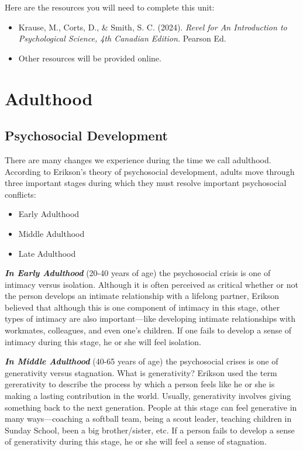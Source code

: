 \documentclass[
]{book}
\providecommand{\tightlist}{%
  \setlength{\itemsep}{0pt}\setlength{\parskip}{0pt}}
\begin{document}
Here are the resources you will need to complete this unit:

\begin{itemize}
\tightlist
\item
  Krause, M., Corts, D., \& Smith, S. C. (2024). \emph{Revel for An Introduction to Psychological Science, 4th Canadian Edition.} Pearson Ed.
\item
  Other resources will be provided online.
\end{itemize}

\hypertarget{adulthood}{%
\section{Adulthood}\label{adulthood}}

\hypertarget{psychosocial-development}{%
\subsection*{Psychosocial Development}\label{psychosocial-development}}

There are many changes we experience during the time we call adulthood. According to Erikson's theory of psychosocial development, adults move through three important stages during which they must resolve important psychosocial conflicts:

\begin{itemize}
\tightlist
\item
  Early Adulthood\\
\item
  Middle Adulthood\\
\item
  Late Adulthood
\end{itemize}

\textbf{\emph{In Early Adulthood}} (20-40 years of age) the psychosocial crisis is one of intimacy versus isolation. Although it is often perceived as critical whether or not the person develops an intimate relationship with a lifelong partner, Erikson believed that although this is one component of intimacy in this stage, other types of intimacy are also important---like developing intimate relationships with workmates, colleagues, and even one's children. If one fails to develop a sense of intimacy during this stage, he or she will feel isolation.

\textbf{\emph{In Middle Adulthood}} (40-65 years of age) the psychosocial crises is one of generativity versus stagnation. What is generativity? Erikson used the term gererativity to describe the process by which a person feels like he or she is making a lasting contribution in the world. Usually, generativity involves giving something back to the next generation. People at this stage can feel generative in many ways---coaching a softball team, being a scout leader, teaching children in Sunday School, been a big brother/sister, etc. If a person fails to develop a sense of generativity during this stage, he or she will feel a sense of stagnation.
\end{document}
